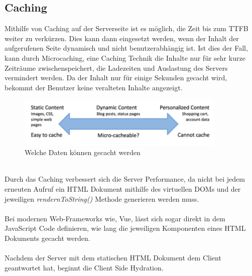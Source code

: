 \documentclass[runningheads]{llncs}
\begin{document}
\subsection{Caching}
\label{subsec:Caching}
Mithilfe von Caching auf der Serverseite ist es möglich, 
die Zeit bis zum TTFB weiter zu verkürzen. 
Dies kann dann eingesetzt werden, 
wenn der Inhalt der aufgerufenen Seite dynamisch und nicht benutzerabhängig ist. 
Ist dies der Fall, kann durch Microcaching, 
eine Caching Technik die Inhalte nur für sehr kurze Zeiträume zwischenspeichert, 
die Ladezeiten und Auslastung des Servers vermindert werden. 
Da der Inhalt nur für einige Sekunden gecacht wird, 
bekommt der Benutzer keine veralteten Inhalte angezeigt. \cite{garett_2015}
\begin{figure}[h]
  \centering
  \includegraphics[width=10cm]{images/caching}
  \caption{Welche Daten können gecacht werden \cite{garett_2015}}
\end{figure}
\\
Durch das Caching verbessert sich die Server Performance, 
da nicht bei jedem erneuten Aufruf ein HTML Dokument mithilfe des virtuellen DOMs und 
der jeweiligen \textit{rendernToString()} Methode generieren werden muss. 
\\
\\
Bei modernen Web-Frameworks wie, Vue, 
lässt sich sogar direkt in dem JavaScript Code definieren, 
wie lang die jeweiligen Komponenten eines HTML Dokuments gecacht werden. 
\\
\\
Nachdem der Server mit dem statischen HTML Dokument dem Client geantwortet hat, 
beginnt die Client Side Hydration.
\end{document}

